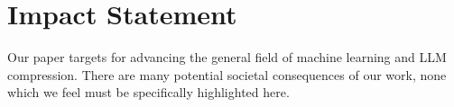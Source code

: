 \section{Impact Statement}

Our paper targets for advancing the general field of machine learning and LLM compression. There are many potential societal consequences of our work, none which we feel must be specifically highlighted here.